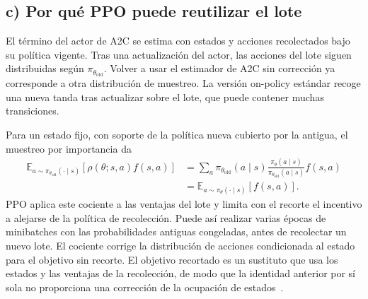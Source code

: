 \subsection*{c) Por qué PPO puede reutilizar el lote}

El término del actor de A2C se estima con estados y acciones recolectados bajo su política vigente. Tras una actualización del actor, las acciones del lote siguen distribuidas según $\pi_{\theta_{\mathrm{old}}}$. Volver a usar el estimador de A2C sin corrección ya corresponde a otra distribución de muestreo. La versión on-policy estándar recoge una nueva tanda tras actualizar sobre el lote, que puede contener muchas transiciones.

Para un estado fijo, con soporte de la política nueva cubierto por la antigua, el muestreo por importancia da
\begin{align*}
    \mathbb{E}_{a\sim\pi_{\theta_{\mathrm{old}}}(\cdot\mid s)}
       [\rho(\theta;s,a)f(s,a)]
      &=\sum_a \pi_{\theta_{\mathrm{old}}}(a\mid s)
            \frac{\pi_\theta(a\mid s)}
                 {\pi_{\theta_{\mathrm{old}}}(a\mid s)} f(s,a)\\
      &=\mathbb{E}_{a\sim\pi_\theta(\cdot\mid s)}[f(s,a)].
\end{align*}
PPO aplica este cociente a las ventajas del lote y limita con el recorte el incentivo a alejarse de la política de recolección. Puede así realizar varias épocas de minibatches con las probabilidades antiguas congeladas, antes de recolectar un nuevo lote. El cociente corrige la distribución de acciones condicionada al estado para el objetivo sin recorte. El objetivo recortado es un sustituto que usa los estados y las ventajas de la recolección, de modo que la identidad anterior por sí sola no proporciona una corrección de la ocupación de estados~\cite[seccs.~2--3 y 5]{schulman2017}.
